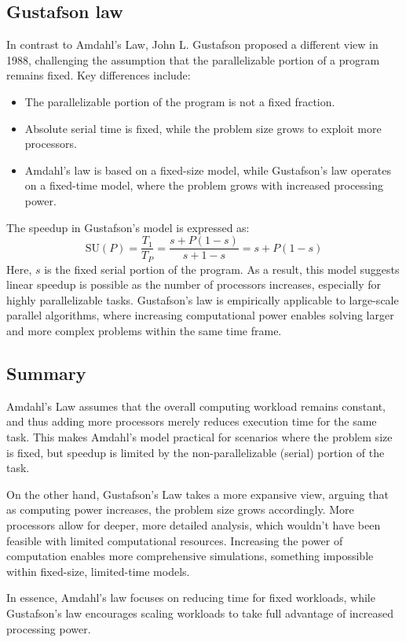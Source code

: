 \subsection{Gustafson law}
In contrast to Amdahl's Law, John L. Gustafson proposed a different view in 1988, challenging the assumption that the parallelizable portion of a program remains fixed. 
Key differences include:
\begin{itemize}
    \item The parallelizable portion of the program is not a fixed fraction.
    \item Absolute serial time is fixed, while the problem size grows to exploit more processors.
    \item Amdahl's law is based on a fixed-size model, while Gustafson's law operates on a fixed-time model, where the problem grows with increased processing power.
\end{itemize}
The speedup in Gustafson's model is expressed as:
\[\text{SU}(P)=\dfrac{T_1}{T_P}=\dfrac{s+P(1-s)}{s+1-s}=s+P(1-s)\]
Here, $s$ is the fixed serial portion of the program.
As a result, this model suggests linear speedup is possible as the number of processors increases, especially for highly parallelizable tasks. 
Gustafson's law is empirically applicable to large-scale parallel algorithms, where increasing computational power enables solving larger and more complex problems within the same time frame.

\subsection{Summary}
Amdahl's Law assumes that the overall computing workload remains constant, and thus adding more processors merely reduces execution time for the same task. 
This makes Amdahl's model practical for scenarios where the problem size is fixed, but speedup is limited by the non-parallelizable (serial) portion of the task.

On the other hand, Gustafson's Law takes a more expansive view, arguing that as computing power increases, the problem size grows accordingly. 
More processors allow for deeper, more detailed analysis, which wouldn't have been feasible with limited computational resources.
Increasing the power of computation enables more comprehensive simulations, something impossible within fixed-size, limited-time models.

In essence, Amdahl's law focuses on reducing time for fixed workloads, while Gustafson's law encourages scaling workloads to take full advantage of increased processing power.